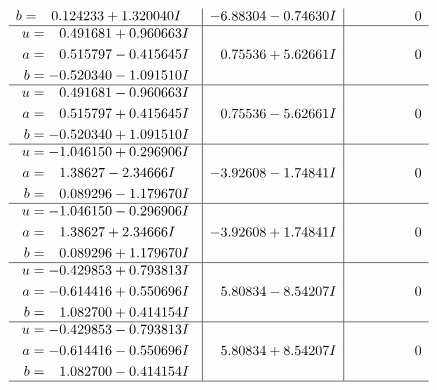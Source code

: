 \documentclass[1p]{elsarticle_modified}
\theoremstyle{definition}
\begin{document}
$$\begin{array}{c|c|c}
\begin{aligned}
b &= \phantom{-}0.124233 + 1.320040 I\end{aligned}
 & -6.88304 - 0.74630 I & \phantom{-0.000000 } 0 \\ \hline\begin{aligned}
u &= \phantom{-}0.491681 + 0.960663 I \\
a &= \phantom{-}0.515797 - 0.415645 I \\
b &= -0.520340 - 1.091510 I\end{aligned}
 & \phantom{-}0.75536 + 5.62661 I & \phantom{-0.000000 } 0 \\ \hline\begin{aligned}
u &= \phantom{-}0.491681 - 0.960663 I \\
a &= \phantom{-}0.515797 + 0.415645 I \\
b &= -0.520340 + 1.091510 I\end{aligned}
 & \phantom{-}0.75536 - 5.62661 I & \phantom{-0.000000 } 0 \\ \hline\begin{aligned}
u &= -1.046150 + 0.296906 I \\
a &= \phantom{-}1.38627 - 2.34666 I \\
b &= \phantom{-}0.089296 - 1.179670 I\end{aligned}
 & -3.92608 - 1.74841 I & \phantom{-0.000000 } 0 \\ \hline\begin{aligned}
u &= -1.046150 - 0.296906 I \\
a &= \phantom{-}1.38627 + 2.34666 I \\
b &= \phantom{-}0.089296 + 1.179670 I\end{aligned}
 & -3.92608 + 1.74841 I & \phantom{-0.000000 } 0 \\ \hline\begin{aligned}
u &= -0.429853 + 0.793813 I \\
a &= -0.614416 + 0.550696 I \\
b &= \phantom{-}1.082700 + 0.414154 I\end{aligned}
 & \phantom{-}5.80834 - 8.54207 I & \phantom{-0.000000 } 0 \\ \hline\begin{aligned}
u &= -0.429853 - 0.793813 I \\
a &= -0.614416 - 0.550696 I \\
b &= \phantom{-}1.082700 - 0.414154 I\end{aligned}
 & \phantom{-}5.80834 + 8.54207 I & \phantom{-0.000000 } 0\\
 \hline 
 \end{array}$$\newpage$$\begin{array}{c|c|c}  

\end{array}$$
\end{document}
